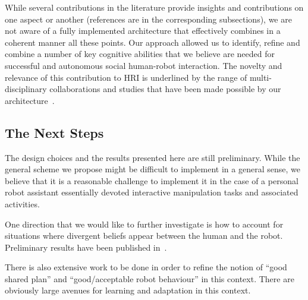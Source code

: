 \documentclass[preprint,3p,times]{elsarticle}
\begin{document}
While several contributions in the literature provide insights and
contributions on one aspect or another (references are in the corresponding
subsections), we are not aware of a fully implemented architecture that
effectively combines in a coherent manner all these points. Our approach
allowed us to identify, refine and combine a number of key cognitive abilities
that we believe are needed for successful and autonomous social human-robot
interaction. The novelty and relevance of this contribution to HRI is
underlined by the range of multi-disciplinary collaborations and studies that
have been made possible by our
architecture~\cite{dautenhahn2006may,koay2007exploratory,Ros2010b,dehais2011physiological,ferreira2015users,GharbiROMAN2015}.


\subsection{The Next Steps}


The design choices and the results presented here are still preliminary.
While the general scheme we propose might be difficult to implement in
a general sense, we believe that it is a reasonable challenge to
implement it in the case of a personal robot assistant essentially
devoted interactive manipulation
tasks and associated activities.

One direction that we would like to further investigate is how to account for
situations where divergent beliefs appear between the human and the robot.
Preliminary results have been published in~\cite{warnier2012when}.

There is also extensive work to be done in order to refine the notion of ``good
shared plan'' and ``good/acceptable robot behaviour'' in this context. There are
obviously large avenues for learning and adaptation in this context.
\end{document}
